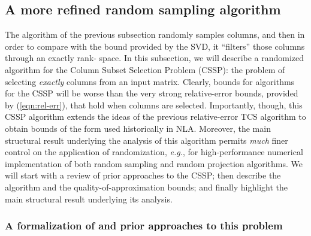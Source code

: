 \documentclass[twoside]{article}
\begin{document}
\subsection{A more refined random sampling algorithm}
\label{sxn:low-rank:exactlyk}

The algorithm of the previous subsection randomly samples 
 columns, and then in order to compare with the 
bound provided by the SVD, it ``filters'' those columns through an exactly 
rank- space.
In this subsection, we will describe a randomized algorithm for the Column 
Subset Selection Problem (CSSP): the problem of selecting \emph{exactly}  
columns from an input matrix.
Clearly, bounds for algorithms for the CSSP will be worse than the very 
strong relative-error bounds, provided by (\ref{eqn:rel-err}), that hold 
when  columns are selected.
Importantly, though, this CSSP algorithm extends the ideas of the previous 
relative-error TCS algorithm to obtain bounds of the form used historically 
in NLA.
Moreover, the main structural result underlying the analysis of this 
algorithm permits \emph{much} finer control on the application of 
randomization, \emph{e.g.}, for high-performance numerical implementation of 
both random sampling and random projection algorithms.
We will start with a review of prior approaches to the CSSP;
then describe the algorithm and the  
quality-of-approximation bounds; and finally highlight the main structural 
result underlying its analysis.


\subsubsection{A formalization of and prior approaches to this problem}
\end{document}
